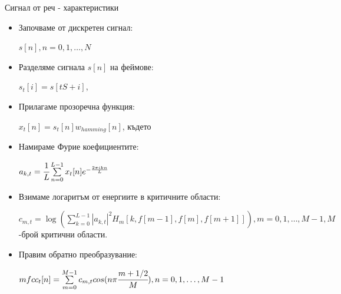 \documentclass[9pt]{beamer}
\newcommand{\B}[1]{\left(#1\right)}
\begin{document}
        \begin{frame}[t]{Сигнал от реч - характеристики}
        \begin{itemize}
            \item Започваме от дискретен сигнал:
            
            $s[n], n = 0, 1, \ldots, N$
            \item Разделяме сигнала $s[n]$ на феймове:
            
            $s_t[i] = s[tS + i]$,
        
            \item Прилагаме прозоречна функция:
            
            $x_t[n] = s_t[n]w_{hamming}[n]$, където
    
            \item Намираме Фурие коефициентите:
            
            $a_{k, t} = \cfrac{1}{L} \sum\limits_{n=0}^{L-1} x_t[n] e^{-\frac{2\pi i k n}{L}}$
            \item Взимаме логаритъм от енергиите в критичните области: 
            
            $c_{m, t} = \log\B{\sum\limits_{k = 0}^{L-1} |a_{k, t}|^2 H_{m}[k, f[m-1], f[m], f[m+1]]}, m = 0, 1, \ldots, M-1, M$-брой критични области.
           
            \item Правим обратно преобразувание:
    
            $mfcc_t[n] = \sum\limits_{m = 0}^{M-1} c_{m, t} cos(n\pi \cfrac{m+1/2}{M}), n = 0, 1, \ldots, M-1$
        \end{itemize}
    \end{frame}
\end{document}

